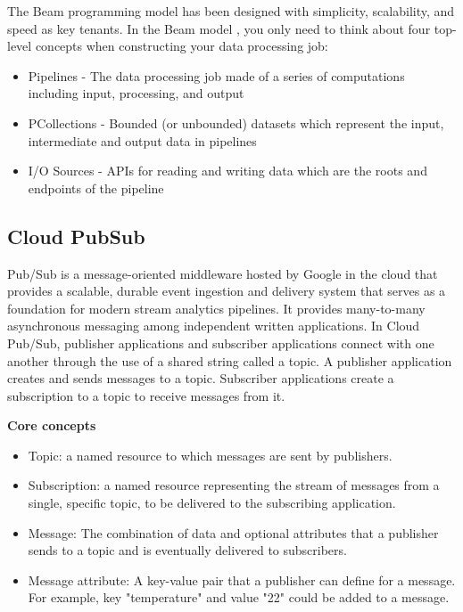 The Beam programming model has been designed with simplicity, scalability, and speed as key tenants. In the Beam model \cite{BeamProposal}, you only need to think about four top-level concepts when constructing your data processing job:

\begin{itemize}
    \item{Pipelines - The data processing job made of a series of computations including input, processing, and output}
    \item{PCollections - Bounded (or unbounded) datasets which represent the input, intermediate and output data in pipelines}
    \item{I/O Sources - APIs for reading and writing data which are the roots and endpoints of the pipeline}
\end{itemize}

\subsection{Cloud PubSub}

Pub/Sub is a message-oriented middleware hosted by Google in the cloud that provides a scalable, durable event ingestion and delivery system that serves as a foundation for modern stream analytics pipelines. It provides many-to-many asynchronous messaging among independent written applications. In Cloud Pub/Sub, publisher applications and subscriber applications connect with one another through the use of a shared string called a topic. A publisher application creates and sends messages to a topic. Subscriber applications create a subscription to a topic to receive messages from it. \cite{PubSub}

\vspace{0.4cm}
\textbf{Core concepts}
\begin{itemize}
    \item{Topic: a named resource to which messages are sent by publishers.}
    \item{Subscription: a named resource representing the stream of messages from a single, specific topic, to be delivered to the subscribing application.}
    \item{Message: The combination of data and optional attributes that a publisher sends to a topic and is eventually delivered to subscribers.}
    \item{Message attribute: A key-value pair that a publisher can define for a message. For example, key "temperature" and value "22" could be added to a message.}
\end{itemize}

